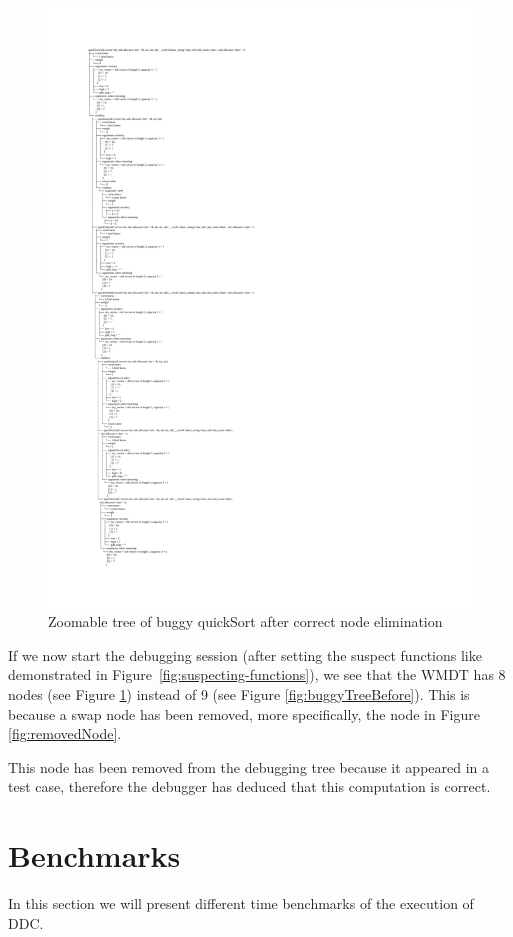 \begin{figure}
\centering
    \caption{Zoomable tree of buggy quickSort after correct node elimination}
    \label{fig:treeAfterRemoval}
\includegraphics[width=\textwidth,height=\textheight,keepaspectratio]{Imagenes/Vectorial/buggySwapRemoved.pdf}
\end{figure}
If we now start the debugging session (after setting the suspect functions like demonstrated in Figure~\ref{fig:suspecting-functions}), we see that the WMDT has 8 nodes (see Figure \ref{fig:treeAfterRemoval}) instead of 9 (see Figure \ref{fig:buggyTreeBefore}). This is because a swap node has been removed, more specifically, the node in Figure \ref{fig:removedNode}.

This node has been removed from the debugging tree because it appeared in a test case, therefore the debugger has deduced that this computation is correct.
\section{Benchmarks}
In this section we will present different time benchmarks of the execution of DDC.

